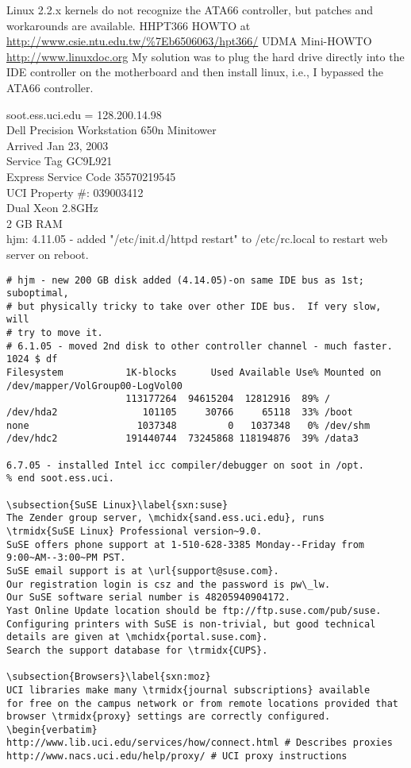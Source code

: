 \documentclass[12pt,twoside]{article}
\begin{document}
Linux 2.2.x kernels do not recognize the ATA66 controller, but patches
and workarounds are available.
HHPT366 HOWTO at \url{http://www.csie.ntu.edu.tw/%7Eb6506063/hpt366/}
UDMA Mini-HOWTO \url{http://www.linuxdoc.org}
My solution was to plug the hard drive directly into the 
IDE controller on the motherboard and then install linux,
i.e., I bypassed the ATA66 controller. 

soot.ess.uci.edu = 128.200.14.98\\
Dell Precision Workstation 650n Minitower\\
Arrived Jan 23, 2003\\
Service Tag GC9L921\\
Express Service Code 35570219545\\
UCI Property \#: 039003412\\
Dual Xeon 2.8GHz\\
2 GB RAM\\
hjm: 4.11.05 - added "/etc/init.d/httpd restart" to /etc/rc.local to 
restart web server on reboot.
\begin{verbatim}
# hjm - new 200 GB disk added (4.14.05)-on same IDE bus as 1st; suboptimal, 
# but physically tricky to take over other IDE bus.  If very slow, will 
# try to move it.
# 6.1.05 - moved 2nd disk to other controller channel - much faster.
1024 $ df
Filesystem           1K-blocks      Used Available Use% Mounted on
/dev/mapper/VolGroup00-LogVol00
                     113177264  94615204  12812916  89% /
/dev/hda2               101105     30766     65118  33% /boot
none                   1037348         0   1037348   0% /dev/shm
/dev/hdc2            191440744  73245868 118194876  39% /data3

6.7.05 - installed Intel icc compiler/debugger on soot in /opt.
% end soot.ess.uci.

\subsection{SuSE Linux}\label{sxn:suse}
The Zender group server, \mchidx{sand.ess.uci.edu}, runs
\trmidx{SuSE Linux} Professional version~9.0.
SuSE offers phone support at 1-510-628-3385 Monday--Friday from
9:00~AM--3:00~PM PST.
SuSE email support is at \url{support@suse.com}.
Our registration login is csz and the password is pw\_lw.
Our SuSE software serial number is 48205940904172.
Yast Online Update location should be ftp://ftp.suse.com/pub/suse.
Configuring printers with SuSE is non-trivial, but good technical 
details are given at \mchidx{portal.suse.com}.
Search the support database for \trmidx{CUPS}.

\subsection{Browsers}\label{sxn:moz}
UCI libraries make many \trmidx{journal subscriptions} available
for free on the campus network or from remote locations provided that
browser \trmidx{proxy} settings are correctly configured.
\begin{verbatim}
http://www.lib.uci.edu/services/how/connect.html # Describes proxies
http://www.nacs.uci.edu/help/proxy/ # UCI proxy instructions
\end{verbatim}
\end{document}
